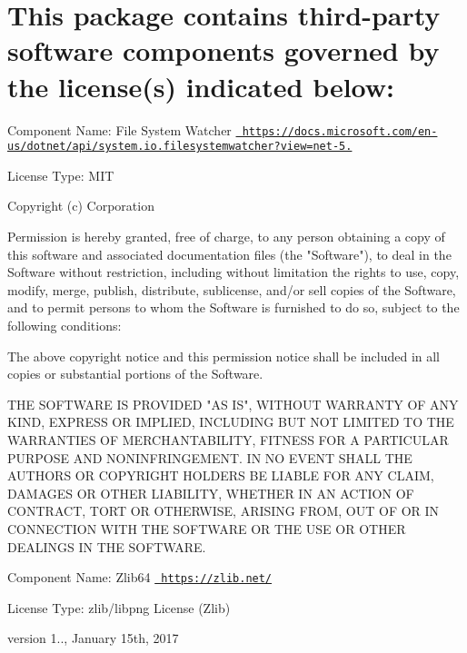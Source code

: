 \chapter{This package contains third-\/party software components governed by the license(s) indicated below\+:}
\hypertarget{md__library_2_package_cache_2com_8unity_8collab-proxy_0d2_83_81_2_third_01_party_01_notices}{}\label{md__library_2_package_cache_2com_8unity_8collab-proxy_0d2_83_81_2_third_01_party_01_notices}
Component Name\+: File System Watcher \href{https://docs.microsoft.com/en-us/dotnet/api/system.io.filesystemwatcher?view=net-5.0}{\texttt{ https\+://docs.\+microsoft.\+com/en-\/us/dotnet/api/system.\+io.\+filesystemwatcher?view=net-\/5.}}

License Type\+: MIT

Copyright (c)  Corporation

Permission is hereby granted, free of charge, to any person obtaining a copy of this software and associated documentation files (the "{}\+Software"{}), to deal in the Software without restriction, including without limitation the rights to use, copy, modify, merge, publish, distribute, sublicense, and/or sell copies of the Software, and to permit persons to whom the Software is furnished to do so, subject to the following conditions\+:

The above copyright notice and this permission notice shall be included in all copies or substantial portions of the Software.

THE SOFTWARE IS PROVIDED "{}\+AS IS"{}, WITHOUT WARRANTY OF ANY KIND, EXPRESS OR IMPLIED, INCLUDING BUT NOT LIMITED TO THE WARRANTIES OF MERCHANTABILITY, FITNESS FOR A PARTICULAR PURPOSE AND NONINFRINGEMENT. IN NO EVENT SHALL THE AUTHORS OR COPYRIGHT HOLDERS BE LIABLE FOR ANY CLAIM, DAMAGES OR OTHER LIABILITY, WHETHER IN AN ACTION OF CONTRACT, TORT OR OTHERWISE, ARISING FROM, OUT OF OR IN CONNECTION WITH THE SOFTWARE OR THE USE OR OTHER DEALINGS IN THE SOFTWARE.

 Component Name\+: Zlib64 \href{https://zlib.net/}{\texttt{ https\+://zlib.\+net/}}

License Type\+: zlib/libpng License (Zlib)

version 1.., January 15th, 2017

